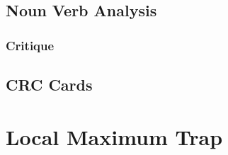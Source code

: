 \subsection{Noun Verb Analysis}
\subsubsection{Critique}


\subsection{CRC Cards}

\section{Local Maximum Trap}


